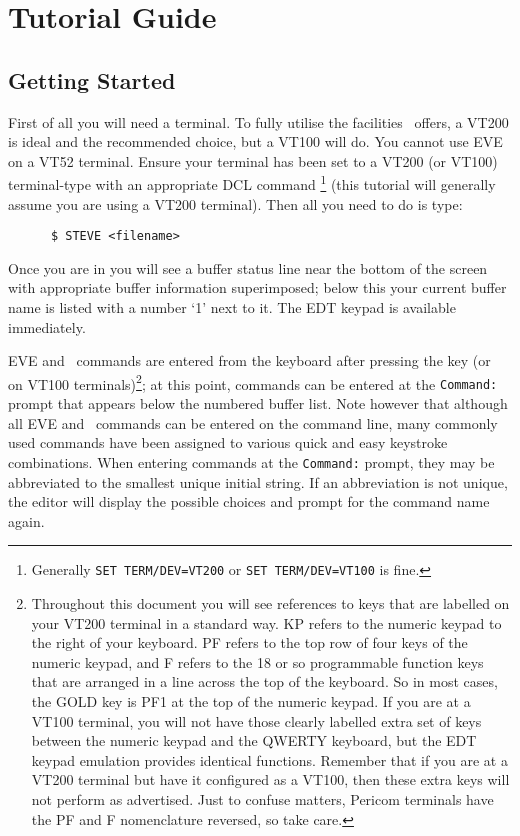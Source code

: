 \section{Tutorial Guide}
\label{tutorial_guide}

\subsection{Getting Started}

First of all you will need a terminal. To fully utilise the facilities \STEve\
offers, a VT200 is ideal and the recommended choice, but a VT100 will do. You
cannot use EVE on a VT52 terminal. Ensure your terminal has been set to a VT200
(or VT100) terminal-type with an appropriate DCL command \footnote{ Generally
{\tt SET TERM/DEV=VT200} or {\tt SET TERM/DEV=VT100} is fine.} (this tutorial
will generally assume you are using a VT200 terminal). Then all you need
to do is type:

\begin{verbatim}
      $ STEVE <filename>
\end{verbatim}

Once you are in you will see a buffer status line near the bottom of the screen
with appropriate buffer information superimposed; below this  your current
buffer name is listed with a number `1' next to it. The EDT keypad is available
immediately.

EVE and \STEve\ commands are entered from the keyboard after pressing the
\keyname{Do} key (or \gold\ \keyname{KP7} on VT100 terminals)\footnote{
Throughout this document you will see references to keys that are labelled on
your VT200 terminal in a standard way. KP refers to the numeric keypad to the
right of your keyboard. PF refers to the top row of four keys of the numeric
keypad, and F refers to the 18 or so programmable function keys that are
arranged in a line across the top of the keyboard. So in most cases, the GOLD
key is PF1 at the top of the numeric keypad. If you are at a VT100 terminal,
you will not have those clearly labelled extra set of keys between the numeric
keypad and the QWERTY keyboard, but the EDT keypad emulation provides identical
functions. Remember that if you are at a VT200 terminal but have it configured
as a VT100, then these extra keys will not perform as advertised. Just to
confuse matters, Pericom terminals have the PF and F nomenclature reversed, so
take care.};
at this point, commands can be entered at the {\tt Command:} prompt that
appears below the numbered buffer list. Note however that although all EVE and
\STEve\ commands can be entered on the command line, many commonly used
commands have been assigned to various quick and easy keystroke combinations.
When entering commands at the {\tt Command:} prompt, they may be abbreviated
to the smallest unique initial string. If an abbreviation is not unique, the
editor will display the possible choices and prompt for the command name again.

